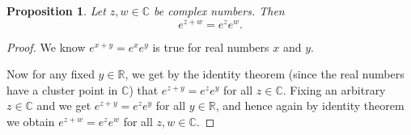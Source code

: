 \documentclass[12pt]{book}
\newcommand{\C}{{\mathbb{C}}}
\newcommand{\R}{{\mathbb{R}}}
\theoremstyle{plain}
\newtheorem{prop}[thm]{Proposition}
\theoremstyle{remark}
\theoremstyle{definition}
\theoremstyle{exercise}
\theoremstyle{example}
\begin{document}
\begin{prop}
Let $z,w \in \C$ be complex numbers.  Then
\begin{equation*}
e^{z+w} = e^z e^w.
\end{equation*}
\end{prop}

\begin{proof}
We know
$e^{x+y} = e^x e^y$ is true for
real numbers $x$ and $y$.

Now for any fixed $y \in \R$, we get by the
identity theorem (since the real numbers have a cluster point in $\C$) that
$e^{z+y} = e^ze^y$ for all $z \in \C$.  Fixing an arbitrary $z \in \C$
and we get
$e^{z+y} = e^ze^y$ for all $y \in \R$, and hence again by identity theorem we obtain
$e^{z+w} = e^z e^w$
for all $z,w \in \C$.
\end{proof}
\end{document}
